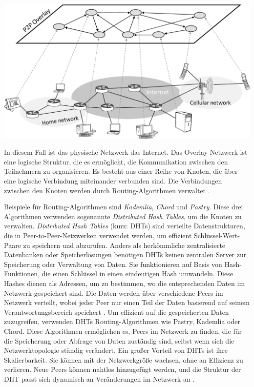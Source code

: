 \begin{center}
    \captionsetup{type=figure}
    \includegraphics[width=0.9\linewidth]{images/overlay_network.png}
    \label{overlay_network}
\end{center}

\noindent In diesem Fall ist das physische Netzwerk das Internet. Das Overlay-Netzwerk ist eine logische Struktur, die es ermöglicht, die Kommunikation zwischen den Teilnehmern zu organisieren. Es besteht aus einer Reihe von Knoten, die über eine logische Verbindung miteinander verbunden sind. Die Verbindungen zwischen den Knoten werden durch Routing-Algorithmen verwaltet \parencite{Lua_P2POverlayNetworksPaper}.

Beispiele für Routing-Algorithmen sind \textit{Kademlia}, \textit{Chord} und \textit{Pastry}. Diese drei Algorithmen verwenden sogenannte \textit{Distributed Hash Tables}, um die Knoten zu verwalten. \textit{Distributed Hash Tables} (kurz: DHTs) sind verteilte Datenstrukturen, die in Peer-to-Peer-Netzwerken verwendet werden, um effizient Schlüssel-Wert-Paare zu speichern und abzurufen. Anders als herkömmliche zentralisierte Datenbanken oder Speicherlösungen benötigen DHTs keinen zentralen Server zur Speicherung oder Verwaltung von Daten. Sie funktionieren auf Basis von Hash-Funktionen, die einen Schlüssel in einen eindeutigen Hash umwandeln. Diese Hashes dienen als Adressen, um zu bestimmen, wo die entsprechenden Daten im Netzwerk gespeichert sind. Die Daten werden über verschiedene Peers im Netzwerk verteilt, wobei jeder Peer nur einen Teil der Daten basierend auf seinem Verantwortungsbereich speichert . Um effizient auf die gespeicherten Daten zuzugreifen, verwenden DHTs  Routing-Algorithmen wie Pastry, Kademlia oder Chord. Diese Algorithmen ermöglichen es, Peers im Netzwerk zu finden, die für die Speicherung oder Abfrage von Daten zuständig sind, selbst wenn sich die Netzwerktopologie ständig verändert. Ein großer Vorteil von DHTs ist ihre Skalierbarkeit. Sie können mit der Netzwerkgröße wachsen, ohne an Effizienz zu verlieren. Neue Peers können nahtlos hinzugefügt werden, und die Struktur der DHT passt sich dynamisch an Veränderungen im Netzwerk an \parencite[S. 43-46]{Balakrishnan_LookingUpDataInP2PSystems} \parencite[postnote]{Stoica_Chord,Rowstron_Pastry,Maymounkov_Kademlia}.


